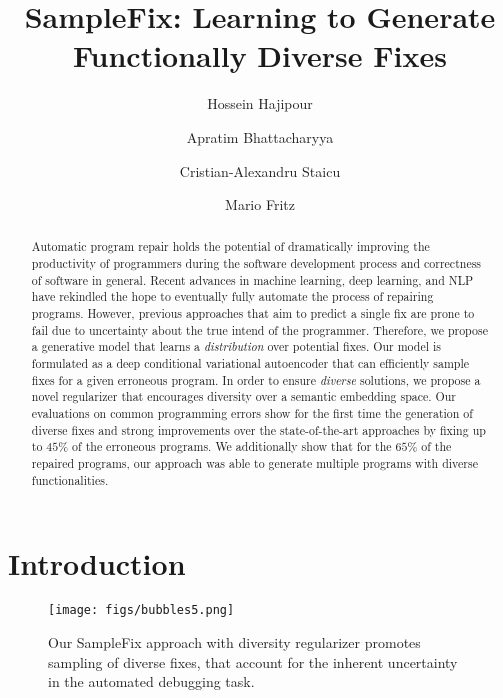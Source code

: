\documentclass[runningheads]{llncs}
\begin{document}
\title{SampleFix: Learning to Generate Functionally Diverse Fixes}
\author{Hossein Hajipour\and
Apratim Bhattacharyya\and Cristian-Alexandru Staicu\and 
Mario Fritz}
\maketitle              \begin{abstract}
Automatic program repair holds the potential of dramatically improving the productivity of programmers during the software development process and correctness of software in general. Recent advances in machine learning, deep learning, and NLP have rekindled the hope to eventually fully automate the process of repairing programs. 
  However, previous approaches that aim to predict a single fix are prone to fail due to uncertainty about the true intend of the programmer. Therefore, we propose a generative model that learns a \textit{distribution} over potential fixes. Our model is formulated as a deep conditional variational autoencoder that can efficiently sample fixes for a given erroneous program. In order to ensure \textit{diverse} solutions, we propose a novel regularizer that encourages diversity over a semantic embedding space. Our evaluations on common programming errors show for the first time the generation of diverse fixes and strong improvements over the state-of-the-art approaches by fixing up to $45\%$ of the erroneous programs. We additionally show that for the $65\%$ of the repaired programs, our approach was able to generate multiple programs with diverse functionalities.  
\end{abstract}
\section{Introduction}


\begin{wrapfigure}[14]{R}{0.4\linewidth}
\vspace{-1.35cm}
\centering
    \texttt{[image: figs/bubbles5.png]}
    \caption{Our SampleFix approach with diversity regularizer promotes sampling of diverse fixes, that account for the inherent uncertainty in the automated debugging task.}
\label{fig:bubbles}
\end{wrapfigure}
\end{document}
